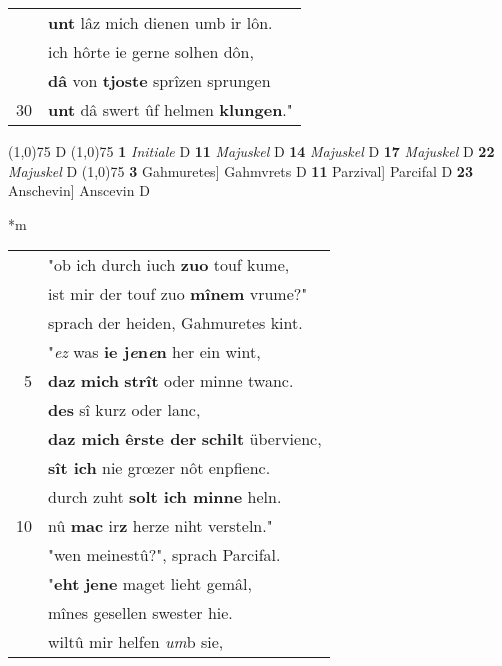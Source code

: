 \documentclass[8pt,a4paper,notitlepage]{article}
\begin{document}
\begin{table}[ht]
\begin{minipage}[t]{0.5\linewidth}
\begin{tabular}{rl}
 & \textbf{unt} lâz mich dienen umb ir lôn.\\ 
 & ich hôrte ie gerne solhen dôn,\\ 
 & \textbf{dâ} von \textbf{tjoste} sprîzen sprungen\\ 
30 & \textbf{unt} dâ swert ûf helmen \textbf{klungen}."\\ 
\end{tabular}
\scriptsize
\line(1,0){75} \newline
D \newline
\line(1,0){75} \newline
\textbf{1} \textit{Initiale} D  \textbf{11} \textit{Majuskel} D  \textbf{14} \textit{Majuskel} D  \textbf{17} \textit{Majuskel} D  \textbf{22} \textit{Majuskel} D  \newline
\line(1,0){75} \newline
\textbf{3} Gahmuretes] Gahmvrets D \textbf{11} Parzival] Parcifal D \textbf{23} Anschevin] Anscevin D \newline
\end{minipage}
\hspace{0.5cm}
\begin{minipage}[t]{0.5\linewidth}
\small
\begin{center}*m
\end{center}
\begin{tabular}{rl}
 & "ob ich durch iuch \textbf{zuo} touf kume,\\ 
 & ist mir der touf zuo \textbf{mînem} vrume?"\\ 
 & sprach der heiden, Gahmuretes kint.\\ 
 & "\textit{ez} was \textbf{ie j\textit{e}n\textit{e}n} her ein wint,\\ 
5 & \textbf{daz} \textbf{mich} \textbf{strît} oder minne twanc.\\ 
 & \textbf{des} sî kurz oder lanc,\\ 
 & \textbf{daz mich} \textbf{êrste der} \textbf{schilt} übervienc,\\ 
 & \textbf{sît ich} nie grœzer nôt enpfienc.\\ 
 & durch zuht \textbf{solt ich minne} heln.\\ 
10 & nû \textbf{mac} ir\textbf{z} herze niht versteln."\\ 
 & "wen meinestû?", sprach Parcifal.\\ 
 & "\textbf{eht} \textbf{jene} maget lieht gemâl,\\ 
 & mînes gesellen swester hie.\\ 
 & wiltû mir helfen \textit{um}b sie,\\ 

\end{tabular}
\end{minipage}
\end{table}
\end{document}
